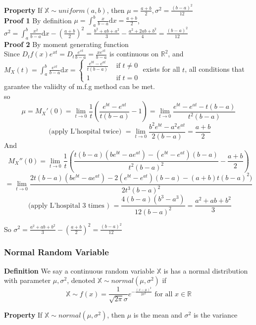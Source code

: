 \documentclass[a4paper,12pt]{article}
\begin{document}
\textbf{Property} If $\mathbb{X} \sim uniform(a, b)$, then $\mu = \frac{a+b}{2}, \sigma^2 = \frac{(b-a)^2}{12}$\\

\textbf{Proof 1} By definition
$\mu = \int_a^b \frac{x}{b-a} \mathrm{d}x = \frac{a+b}{2}$,\\ $\sigma^2 = \int_a^b \frac{x^2}{b-a} \mathrm{d}x - (\frac{a+b}{2})^2 = \frac{b^2+ab+a^2}{3} - \frac{a^2+2ab+b^2}{4} = \frac{(b-a)^2}{12}$\\

\textbf{Proof 2} By moment generating function\\

Since $D_t f(x)e^{xt} = D_t \frac{e^{xt}}{b-a} = \frac{xe^{xt}}{b-a}$ is continuous on $\mathbb{R}^2$, and\\
$M_X(t) = \int_a^b \frac{e^{xt}}{b-a} \mathrm{d}x = 
\begin{cases}
\frac{e^{bt}-e^{at}}{t(b-a)} & \text{ if } t \neq 0\\
1 & \text{ if } t = 0
\end{cases}$ exists for all $t$, all conditions that garantee the valiidty of m.f.g method can be met.\\
so
$$\mu = M_X'(0) = \lim_{t\to 0} \frac{1}{t}( \frac{e^{bt}-e^{at}}{t(b-a)} - 1 ) = \lim_{t\to 0} \frac{e^{bt}-e^{at}-t(b-a)}{t^2(b-a)}$$
$$\text{ (apply L'hospital twice) }= \lim_{t\to 0} \frac{b^2e^{bt}-a^2e^{at}}{2(b-a)} = \frac{a+b}{2} $$
And
$$M_X''(0) = \lim_{t\to 0} \frac{1}{t}( \frac{t(b-a)(be^{bt}-ae^{at})-(e^{bt}-e^{at})(b-a)}{t^2(b-a)^2} - \frac{a+b}{2} )$$
$$= \lim_{t\to 0} \frac{2t(b-a)(be^{bt}-ae^{at})-2(e^{bt}-e^{at})(b-a) - (a+b)t(b-a)^2)}{2t^3(b-a)^2}$$
$$\text{ (apply L'hospital 3 times ) }= \frac{4(b-a)(b^3-a^3)}{12(b-a)^2} = \frac{a^2 + ab + b^2}{3}$$

So $\sigma^2 = \frac{a^2 + ab + b^2}{3} - (\frac{a+b}{2})^2 = \frac{(b-a)^2}{12}$

\subsubsection{Normal Random Variable}
\textbf{Definition} We say a continuous random variable $\mathbb{X}$ is has a normal distribution with parameter $\mu, \sigma^2$, denoted $\mathbb{X} \sim normal(\mu, \sigma^2)$ if
$$
 \mathbb{X} \sim f(x) = \frac{1}{\sqrt{2\pi}\sigma}e^{-\frac{(x-\mu)^2}{2\sigma^2}}
 \text{ for all } x\in\mathbb{R}
$$

\textbf{Property} If $\mathbb{X} \sim normal(\mu, \sigma^2)$, then $\mu$ is the mean and $\sigma^2$ is the variance\\
\end{document}
